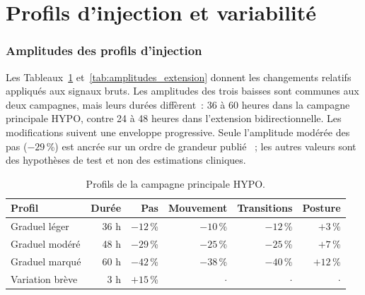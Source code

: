 \section{Profils d'injection et variabilité}
\subsubsection{Amplitudes des profils d'injection}
Les Tableaux~\ref{tab:amplitudes_hypo} et~\ref{tab:amplitudes_extension} donnent les
changements relatifs appliqués aux signaux bruts. Les amplitudes des trois baisses sont
communes aux deux campagnes, mais leurs durées diffèrent~: 36 à 60 heures dans la campagne
principale HYPO, contre 24 à 48 heures dans l'extension bidirectionnelle. Les modifications
suivent une enveloppe progressive. Seule l'amplitude modérée des pas ($-29$\,\%) est ancrée
sur un ordre de grandeur publié \citep{paudyal2021lying}~; les autres valeurs sont des
hypothèses de test et non des estimations cliniques.

\begin{table}[H]
  \centering
  \caption{Profils de la campagne principale HYPO.}
  \label{tab:amplitudes_hypo}
  \small
  \begin{tabular}{lrrrrr}
    \toprule
    Profil & Durée & Pas & Mouvement & Transitions & Posture \\
    \midrule
    Graduel léger & 36 h & $-12$\,\% & $-10$\,\% & $-12$\,\% & $+3$\,\% \\
    Graduel modéré & 48 h & $-29$\,\% & $-25$\,\% & $-25$\,\% & $+7$\,\% \\
    Graduel marqué & 60 h & $-42$\,\% & $-38$\,\% & $-40$\,\% & $+12$\,\% \\
    Variation brève & 3 h & $+15$\,\% & $\cdot$ & $\cdot$ & $\cdot$ \\
    \bottomrule
  \end{tabular}
\end{table}

